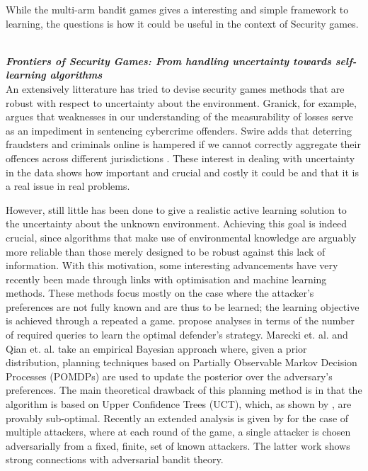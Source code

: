
While the multi-arm bandit games gives a interesting and simple framework to learning, the questions is how it could be useful in the context of Security games.


\noindent \textbf{\textit{\\Frontiers of Security Games: From handling uncertainty towards self-learning algorithms}}\\
An extensively litterature has tried to  devise security games methods that are robust with respect to uncertainty about the environment\cite{aghassi2006robust,Nguyen14RO, Kiekintveld:2013}.
Granick, for example,
argues that weaknesses in our understanding of the measurability of losses serve as
an impediment in sentencing cybercrime offenders\cite{granick2005faking}. Swire adds that deterring
fraudsters and criminals online is hampered if we cannot correctly aggregate their
offences across different jurisdictions \cite{swire2009no}. These  interest in dealing with uncertainty in the data shows how important and crucial and costly it could be and that it is a real issue in real problems.


However, still little has been done to give a realistic active learning solution to the uncertainty about  the unknown environment. Achieving this goal is indeed crucial, since algorithms that make use of environmental knowledge are arguably more reliable than those merely designed to be robust against this lack of information. With this motivation, some interesting advancements have very recently been made through links with optimisation and machine learning methods. 
These methods focus mostly on the case where the attacker's preferences are not fully known and are thus to be learned; the learning objective is achieved through a repeated a game.  \cite{blum2014learning, letchford2009learning} propose analyses in terms of the number of required queries to learn the optimal defender's strategy. 
Marecki et. al. and Qian et. al.\cite{Marecki12PR, qian2014online} take an empirical Bayesian approach where, given a prior distribution, planning techniques based on Partially Observable Markov Decision Processes (POMDPs) are used to update the posterior over the adversary's preferences.
The main theoretical drawback of this planning method is in that the algorithm is based on Upper Confidence Trees (UCT), which, as shown by  \cite{munos2014bandits}, are provably sub-optimal. 
Recently an extended analysis is given by \cite{Balcan15CR}  for the case of multiple attackers, where at each round of the game, a single attacker is chosen adversarially from a fixed, finite, set of known attackers. The latter work shows strong connections with adversarial bandit theory. 

